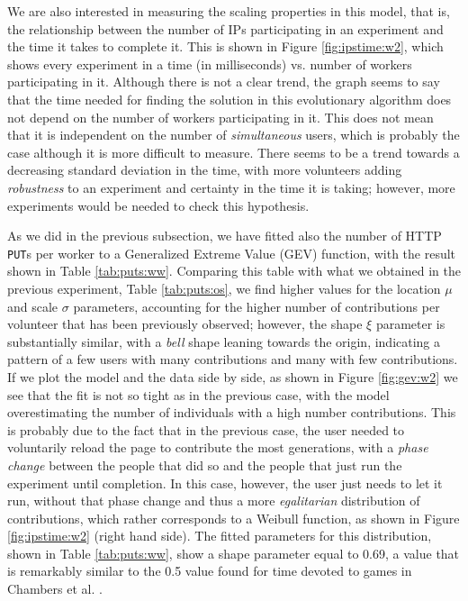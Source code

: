 \documentclass[journal,onecolumn]{IEEEtran}
\begin{document}
%
We are also interested in measuring the scaling properties in this
model, that is, the relationship between the number of IPs
participating in an experiment and the time it takes to complete
it. This is shown in Figure \ref{fig:ipstime:w2}, which shows every
experiment in a time (in milliseconds) vs. number of workers participating
in it. Although there is not a clear trend, the graph seems to say
that the time needed for finding the solution in this evolutionary
algorithm does not depend on the number of workers participating in
it. This does not mean that it is independent on the number of {\em
  simultaneous} users, which is probably the case although it is more
difficult to measure. There seems to be a trend towards a decreasing
standard deviation in the time, with more volunteers adding {\em
  robustness} to an experiment and certainty in the time it is taking;
however, more experiments would be needed to check this hypothesis.

As we did in the previous subsection, we have fitted also the number
of HTTP {\tt PUT}s per worker to a  Generalized Extreme Value (GEV) function, with the result shown %
in Table \ref{tab:puts:ww}. Comparing this table with what we obtained
in the previous experiment, Table \ref{tab:puts:os}, we find higher values
for the location $\mu$ and scale $\sigma$ parameters, accounting for
the higher number of contributions per volunteer that has been
previously observed; however, the shape $\xi$ parameter is
substantially similar, with a {\em bell} shape leaning towards the
origin, indicating a pattern of a few users with many contributions
and many with few contributions. If we plot the model and the data
side by side, as shown in Figure \ref{fig:gev:w2} we see that the fit
is not so tight as in the previous case, with the model overestimating
the number of individuals with a high number contributions. This is
probably due to the fact that in the previous case, the user needed to
voluntarily reload the page to contribute the most generations, with a
{\em phase change} between the people that did so and the people that
just run the experiment until completion. In this case, however, the
user just needs to let it run, without that phase change and thus a
more {\em egalitarian} distribution of contributions, which rather
corresponds to a Weibull function, as shown in Figure
\ref{fig:ipstime:w2} (right hand side). The fitted parameters for this
distribution, shown in Table \ref{tab:puts:ww}, show a shape parameter
equal to 0.69, a value that is remarkably similar to the 0.5 value
found for time devoted to games in Chambers et
al. \cite{chambers2005measurement}.
\end{document}
